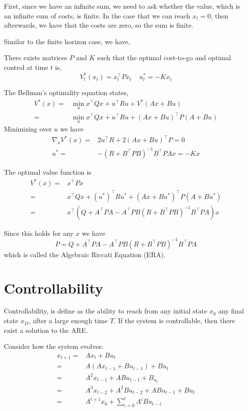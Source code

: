 First, since we have an infinite sum, we need to ask whether the value, which is an infinite sum of costs, is finite. In the case that we can reach $x_t=0$, then
afterwards, we have that the costs are zero, so the sum is finite.

Similar to the finite horizon case, we have,
\begin{theorem}
There exists matrices $P$ and $K$ such that the optimal cost-to-go
and optimal control at time $t$ is,
\[
V^*_t(x_t)=x_t^\top P x_t \;\;\;\; u_t^*=-K x_t
\]
\end{theorem}

The Bellman's optimality equation states,
\begin{align*}
V^*(x)=& \min_u  x^\top Qx + u^\top Ru+V^*(Ax+Bu)\\
=& \min_u  x^\top Qx + u^\top Ru+(Ax+Bu)^\top P(A+Bu)
\end{align*}
Minimizing over $u$ we have
\begin{align*}
\nabla_u V^*(x)=&  2 u^\top R+2(Ax+Bu)^\top P=0\\
u^*=& -(R+B^\top PB)^{-1}B^\top PAx=-Kx
\end{align*}

The optimal value function is
\begin{align*}
V^*(x)=& x^\top Px\\
=& x^\top Qx + (u^*)^\top Ru^*+(Ax+Bu^*)^\top P(A+Bu^*)\\
=& x^\top (Q+A^\top P A - A^\top P B(R+B^\top P B)^{-1} B^\top P A)x
\end{align*}

Since this holds for any $x$ we have
\[
P=Q+A^\top P A - A^\top P B(R+B^\top P B)^{-1} B^\top P A
\]
which is called the Algebraic Riccati Equation (ERA).


\section{Controllability}

Controllability, is define as the ability to reach from any initial
state $x_0$ any final state $x_D$, after a large enough time $T$. If
the system is controllable, then there exist a solution to the ARE.

Consider how the system evolves:
\begin{align*}
x_{t+1}=& Ax_t+Bu_t\\
=& A(Ax_{t-1}+Bu_{t-1})+Bu_t\\
=&A^2x_{t-1}+ABu_{t-1}+B_{u_t}\\
=& A^3 x_{t-2}+A^2B u_{t-2}+AB u_{t-1}+Bu_t\\
=&A^{t+1} x_0+\sum_{i=0}^{t} A^i B u _{t-i}
\end{align*}


